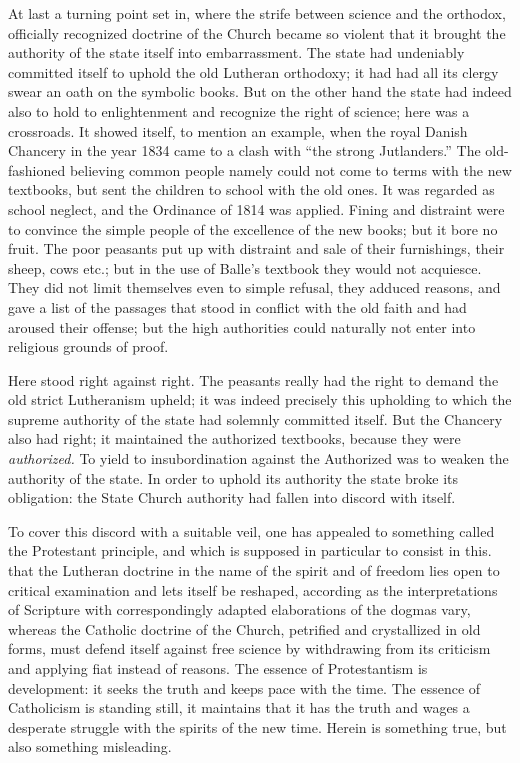 \documentclass[12pt,a4paper,openany]{book}
\newcommand{\opage}[1]{\marginnote{\footnotesize\textit{[#1]}}}
\newcounter{lect}
\begin{document}
At last a turning point set in, where the strife
between science and the orthodox, officially recognized
doctrine of the Church became so violent that it brought the authority of the state
itself into embarrassment. The state had undeniably
committed itself to uphold the old Lutheran
orthodoxy; it had had all its clergy swear
an oath on the symbolic books. But on the other hand
\setcounter{footnote}{0}%
\opage{83}the state had indeed also to hold to enlightenment and recognize
the right of science; here was a crossroads. It
showed itself, to mention an example, when the royal
Danish Chancery in the year 1834 came to a clash with
``the strong Jutlanders.'' The old-fashioned believing common people
namely could not come to terms with the new textbooks,
but sent the children to school with the old ones.
It was regarded as school neglect, and the Ordinance %
of 1814 was applied. Fining and
distraint were to convince the simple people of
the excellence of the new books; but it bore no fruit.
The poor peasants put up with distraint and sale of
their furnishings, their sheep, cows etc.; but in the use
of Balle's textbook they would not acquiesce. They did not limit
themselves even to simple refusal, they adduced
reasons, and gave a list of the passages that
stood in conflict with the old faith and had aroused their
offense; but the high authorities could naturally %
not enter into religious grounds of proof.

Here stood right against right. The peasants really had the
right to demand the old strict Lutheranism upheld;
it was indeed precisely this upholding to which
the supreme authority of the state had solemnly committed
itself. But the Chancery also had right; it maintained the
authorized textbooks, because they were \emph{authorized.}
To yield to insubordination against the
Authorized was to weaken the authority of the state. In order to
uphold its authority the state broke its obligation:
the State Church authority had fallen into
discord with itself.

To cover this discord with a suitable veil,
one has appealed to something called the
\setcounter{footnote}{0}%
\opage{84}Protestant principle, and which is supposed in particular to consist in this. that
the Lutheran doctrine in the name of the spirit and of freedom
lies open to critical examination and lets itself be reshaped,
according as the interpretations of Scripture with correspondingly adapted
elaborations of the dogmas vary, whereas the Catholic
doctrine of the Church, petrified and crystallized in old forms,
must defend itself against free science by withdrawing
from its criticism and applying fiat instead of
reasons. The essence of Protestantism is development: it
seeks the truth and keeps pace with the time. The essence
of Catholicism is standing still, it maintains that it has the truth
and wages a desperate struggle with the spirits of the new
time. Herein is something true, but also something misleading.
\end{document}

